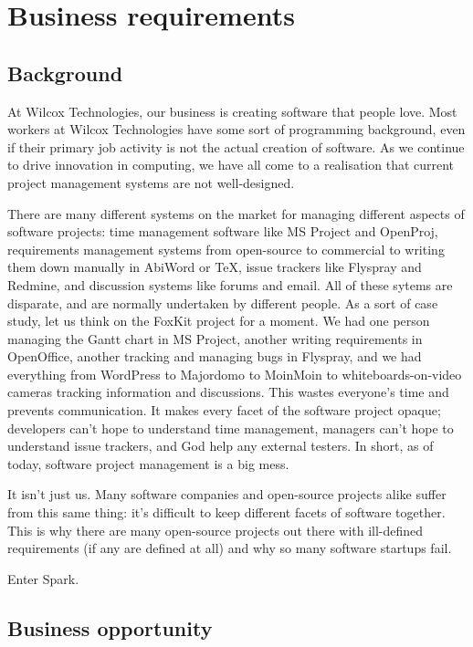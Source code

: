 
\section{Business requirements}
\sectionrule


\subsection{Background}
\subsectionrule

At Wilcox Technologies, our business is creating software that people love. Most workers at Wilcox Technologies have some sort of programming background, even if their primary job activity is not the actual creation of software. As we continue to drive innovation in computing, we have all come to a realisation that current project management systems are not well-designed.

There are many different systems on the market for managing different aspects of software projects: time management software like MS Project and OpenProj, requirements management systems from open-source to commercial to writing them down manually in AbiWord or \TeX, issue trackers like Flyspray and Redmine, and discussion systems like forums and email. All of these sytems are disparate, and are normally undertaken by different people. As a sort of case study, let us think on the FoxKit project for a moment. We had one person managing the Gantt chart in MS Project, another writing requirements in OpenOffice, another tracking and managing bugs in Flyspray, and we had everything from WordPress to Majordomo to MoinMoin to whiteboards-on-video cameras tracking information and discussions. This wastes everyone’s time and prevents communication. It makes every facet of the software project opaque; developers can’t hope to understand time management, managers can’t hope to understand issue trackers, and God help any external testers. In short, as of today, software project management is a big mess.

It isn’t just us. Many software companies and open-source projects alike suffer from this same thing: it’s difficult to keep different facets of software together. This is why there are many open-source projects out there with ill-defined requirements (if any are defined at all) and why so many software startups fail.

Enter Spark.


\subsection{Business opportunity}
\subsectionrule

